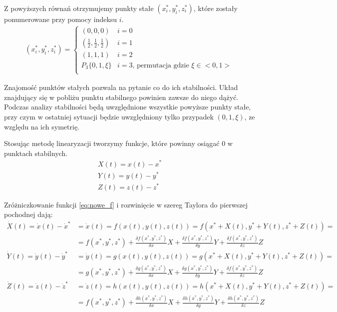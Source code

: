 Z powyższych równań otrzymujemy punkty stałe $(x^*_i, y^*_i, z^*_i)$, które zostały ponumerowane przy pomocy indeksu $i$.
\begin{align}
(x^*_i, y^*_i, z^*_i) = \left\{
\begin{array}{ll}
(0,0,0)  & i=0 \\
(\frac{1}{2},\frac{1}{2},\frac{1}{2}) & i=1 \\
(1,1,1) & i=2 \\
P_3 \{0,1,\xi \} & i=3 \text{, permutacja gdzie }\xi \in <0,1>\\ 
\end{array}
\right.
\end{align}

Znajomość punktów stałych pozwala na pytanie co do ich stabilności. Układ znajdujący się w pobliżu punktu stabilnego powinien zawsze do niego dążyć. Podczas analizy stabilności będą uwzględnione wszystkie powyższe punkty stałe, przy czym w ostatniej sytuacji będzie uwzględniony tylko przypadek $(0,1,\xi)$, ze względu na ich symetrię.

Stosując metodę linearyzacji tworzymy funkcje, które powinny osiągać 0 w punktach stabilnych.
\begin{align}\label{eq:nowe_f}
X(t)=x(t)-x^* \nonumber\\
Y(t)=y(t)-y^* \\
Z(t)=z(t)-z^* \nonumber
\end{align}

Zróżniczkowanie funkcji \ref{eq:nowe_f} i rozwinięcie w szereg Taylora do pierwszej pochodnej dają:
\begin{align}
\dot{X}(t)=\dot{x}(t)-\dot{x}^* &=\dot{x}(t)=f(x(t),y(t),z(t))=f(x^*+X(t),y^*+Y(t),z^*+Z(t))= \nonumber\\
&=f(x^*,y^*,z^*)+\frac{\delta f(x^*,y^*,z^*)}{\delta x}X+\frac{\delta f(x^*,y^*,z^*)}{\delta y}Y+\frac{\delta f(x^*,y^*,z^*)}{\delta z}Z \nonumber\\
\dot{Y}(t)=\dot{y}(t)-\dot{y}^* &=\dot{y}(t)=g(x(t),y(t),z(t))=g(x^*+X(t),y^*+Y(t),z^*+Z(t))=\\
&=g(x^*,y^*,z^*)+\frac{\delta g(x^*,y^*,z^*)}{\delta x}X+\frac{\delta g(x^*,y^*,z^*)}{\delta y}Y+\frac{\delta f(x^*,y^*,z^*)}{\delta z}Z \nonumber\\
\dot{Z}(t)=\dot{z}(t)-\dot{z}^* &=\dot{z}(t)=h(x(t),y(t),z(t))=h(x^*+X(t),y^*+Y(t),z^*+Z(t))=\nonumber\\
&=f(x^*,y^*,z^*)+\frac{\delta h(x^*,y^*,z^*)}{\delta x}X+\frac{\delta h(x^*,y^*,z^*)}{\delta y}Y+\frac{\delta h(x^*,y^*,z^*)}{\delta z}Z\nonumber
\end{align}


